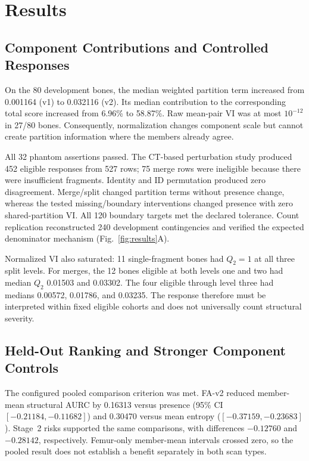 \documentclass[conference]{IEEEtran}
\begin{document}
\section{Results}
\subsection{Component Contributions and Controlled Responses}
On the 80 development bones, the median weighted partition term increased from 0.001164 (v1) to 0.032116 (v2). Its median contribution to the corresponding total score increased from 6.96\% to 58.87\%. Raw mean-pair VI was at most $10^{-12}$ in 27/80 bones. Consequently, normalization changes component scale but cannot create partition information where the members already agree.

All 32 phantom assertions passed. The CT-based perturbation study produced 452 eligible responses from 527 rows; 75 merge rows were ineligible because there were insufficient fragments. Identity and ID permutation produced zero disagreement. Merge/split changed partition terms without presence change, whereas the tested missing/boundary interventions changed presence with zero shared-partition VI. All 120 boundary targets met the declared tolerance. Count replication reconstructed 240 development contingencies and verified the expected denominator mechanism (Fig.~\ref{fig:results}A).

Normalized VI also saturated: 11 single-fragment bones had $Q_2=1$ at all three split levels. For merges, the 12 bones eligible at both levels one and two had median $Q_2$ 0.01503 and 0.03302. The four eligible through level three had medians 0.00572, 0.01786, and 0.03235. The response therefore must be interpreted within fixed eligible cohorts and does not universally count structural severity.

\subsection{Held-Out Ranking and Stronger Component Controls}
The configured pooled comparison criterion was met. FA-v2 reduced member-mean structural AURC by 0.16313 versus presence (95\% CI $[-0.21184,-0.11682]$) and 0.30470 versus mean entropy ($[-0.37159,-0.23683]$). Stage~2 risks supported the same comparisons, with differences $-0.12760$ and $-0.28142$, respectively. Femur-only member-mean intervals crossed zero, so the pooled result does not establish a benefit separately in both scan types.
\end{document}
